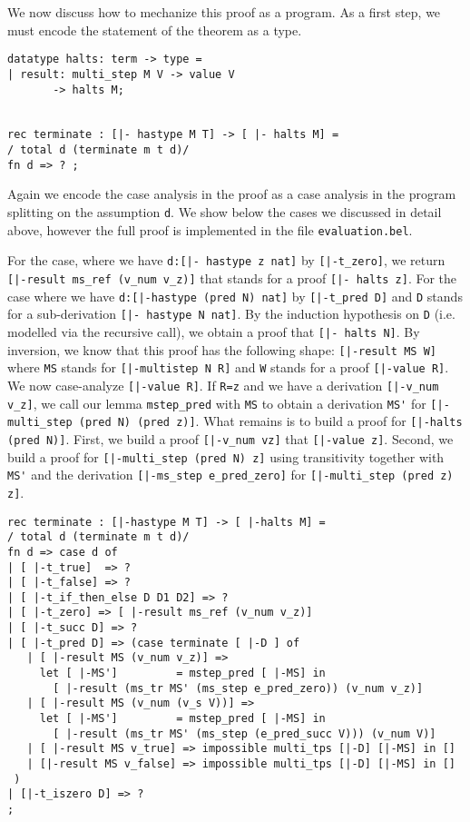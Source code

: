 We now discuss how to mechanize this proof as a program. As a first step, we
must encode the statement of the theorem as a type. 

\begin{lstlisting}
datatype halts: term -> type = 
| result: multi_step M V -> value V
       -> halts M;


rec terminate : [|- hastype M T] -> [ |- halts M] = 
/ total d (terminate m t d)/
fn d => ? ;

\end{lstlisting}

Again we encode the case analysis in the proof as a case analysis in the program
splitting on the assumption \lstinline!d!. We show below the cases we discussed
in detail above, however the full proof is implemented in the file
\lstinline!evaluation.bel!.

For the case, where we have \lstinline!d:[|- hastype z nat]! by 
\lstinline![|-t_zero]!, we return \lstinline![|-result ms_ref (v_num v_z)]! that
stands for a proof \lstinline![|- halts z]!. For the case where we have
\lstinline!d:[|-hastype (pred N) nat]! by \lstinline![|-t_pred D]! and
\lstinline!D! stands for a sub-derivation \lstinline![|- hastype N nat]!. By the 
induction hypothesis on \lstinline!D! (i.e. modelled via the recursive call), we
obtain a proof that \lstinline![|- halts N]!.  By inversion, we know that this
proof has the following shape: \lstinline![|-result MS W]! where \lstinline!MS!
stands for \lstinline![|-multistep N R]! and \lstinline!W!
stands for a proof \lstinline![|-value R]!. We now case-analyze
\lstinline![|-value R]!. If \lstinline!R=z! and we have a derivation
\lstinline![|-v_num v_z]!, we call our lemma \lstinline!mstep_pred! with
\lstinline!MS! to obtain a derivation \lstinline!MS'! for 
\lstinline![|-multi_step (pred N) (pred z)]!. What remains is to build a proof
for \lstinline![|-halts (pred N)]!. First, we build a proof \lstinline![|-v_num vz]!
that \lstinline![|-value z]!. Second, we build a proof for 
\lstinline![|-multi_step (pred N) z]! using transitivity together with
\lstinline!MS'! and the derivation \lstinline![|-ms_step e_pred_zero]! for
\lstinline![|-multi_step (pred z) z]!.


\begin{lstlisting}
rec terminate : [|-hastype M T] -> [ |-halts M] = 
/ total d (terminate m t d)/
fn d => case d of 
| [ |-t_true]  => ?
| [ |-t_false] => ?
| [ |-t_if_then_else D D1 D2] => ?
| [ |-t_zero] => [ |-result ms_ref (v_num v_z)]
| [ |-t_succ D] => ? 
| [ |-t_pred D] => (case terminate [ |-D ] of
   | [ |-result MS (v_num v_z)] =>
     let [ |-MS']         = mstep_pred [ |-MS] in
       [ |-result (ms_tr MS' (ms_step e_pred_zero)) (v_num v_z)]
   | [ |-result MS (v_num (v_s V))] =>
     let [ |-MS']         = mstep_pred [ |-MS] in
       [ |-result (ms_tr MS' (ms_step (e_pred_succ V))) (v_num V)]
   | [ |-result MS v_true] => impossible multi_tps [|-D] [|-MS] in []
   | [|-result MS v_false] => impossible multi_tps [|-D] [|-MS] in []
 )
| [|-t_iszero D] => ?
;
\end{lstlisting}



